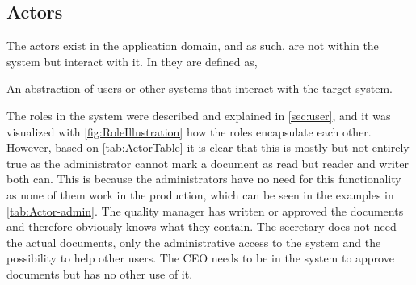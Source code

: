 \subsection{Actors}\label{sec:Actors}
The actors exist in the application domain, and as such, are not within the system but interact with it.
In \citep[p.~121]{Rod-Aalborg} they are defined as,

\begin{defn}
An abstraction of users or other systems that interact with the target system.
\end{defn}

The roles in the system were described and explained in \cref{sec:user}, and it was visualized with \cref{fig:RoleIllustration} how the roles encapsulate each other.
However, based on \cref{tab:ActorTable} it is clear that this is mostly but not entirely true as the administrator cannot mark a document as read but reader and writer both can.
This is because the administrators have no need for this functionality as none of them work in the production, which can be seen in the examples in \cref{tab:Actor-admin}.
The quality manager has written or approved the documents and therefore obviously knows what they contain.
The secretary does not need the actual documents, only the administrative access to the system and the possibility to help other users.
The CEO needs to be in the system to approve documents but has no other use of it.

